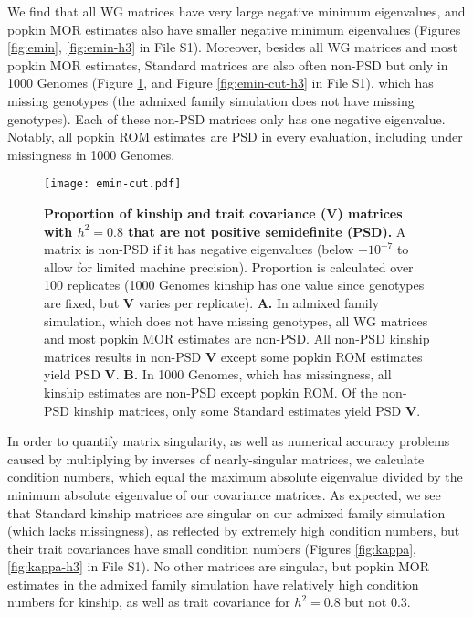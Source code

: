 \documentclass[9pt,twocolumn,twoside]{gsajnl}
\begin{document}
We find that all WG matrices have very large negative minimum eigenvalues, and popkin MOR estimates also have smaller negative minimum eigenvalues (Figures \ref*{fig:emin}, \ref*{fig:emin-h3} in File S1).
Moreover, besides all WG matrices and most popkin MOR estimates, Standard matrices are also often non-PSD but only in 1000 Genomes (Figure \ref{fig:emin-cut}, and Figure \ref*{fig:emin-cut-h3} in File S1), which has missing genotypes (the admixed family simulation does not have missing genotypes).
Each of these non-PSD matrices only has one negative eigenvalue.
Notably, all popkin ROM estimates are PSD in every evaluation, including under missingness in 1000 Genomes.

\begin{figure}[tb]
  \centering
  \texttt{[image: emin-cut.pdf]}
  \caption{
    {\bf Proportion of kinship and trait covariance ($\mathbf{V}$) matrices with $h^2=0.8$ that are not positive semidefinite (PSD).}
    A matrix is non-PSD if it has negative eigenvalues (below $-10^{-7}$ to allow for limited machine precision).
    Proportion is calculated over 100 replicates (1000 Genomes kinship has one value since genotypes are fixed, but $\mathbf{V}$ varies per replicate).
    \textbf{A.}
    In admixed family simulation, which does not have missing genotypes, all WG matrices and most popkin MOR estimates are non-PSD.
    All non-PSD kinship matrices results in non-PSD $\mathbf{V}$ except some popkin ROM estimates yield PSD $\mathbf{V}$.
    \textbf{B.}
    In 1000 Genomes, which has missingness, all kinship estimates are non-PSD except popkin ROM.
    Of the non-PSD kinship matrices, only some Standard estimates yield PSD $\mathbf{V}$.
  }
  \label{fig:emin-cut}
\end{figure}

In order to quantify matrix singularity, as well as numerical accuracy problems caused by multiplying by inverses of nearly-singular matrices, we calculate condition numbers, which equal the maximum absolute eigenvalue divided by the minimum absolute eigenvalue of our covariance matrices.
As expected, we see that Standard kinship matrices are singular on our admixed family simulation (which lacks missingness), as reflected by extremely high condition numbers, but their trait covariances have small condition numbers (Figures \ref*{fig:kappa}, \ref*{fig:kappa-h3} in File S1).
No other matrices are singular, but popkin MOR estimates in the admixed family simulation have relatively high condition numbers for kinship, as well as trait covariance for $h^2=0.8$ but not 0.3.
\end{document}
